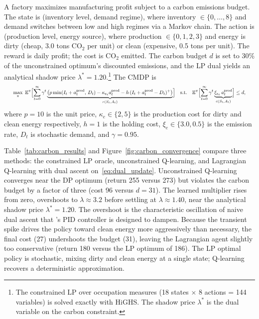 A factory maximizes manufacturing profit subject to a carbon
emissions budget. The state is (inventory level, demand regime),
where inventory $\in \{0,\ldots,8\}$ and demand switches between
low and high regimes via a Markov chain. The action is
(production level, energy source), where production $\in \{0,1,2,3\}$
and energy is dirty (cheap, 3.0 tons CO$_2$ per unit) or clean
(expensive, 0.5 tons per unit). The reward is daily profit; the
cost is CO$_2$ emitted. The carbon budget $d$ is set to 30\% of the
unconstrained optimum's discounted emissions, and the LP dual
yields an analytical shadow price $\lambda^* = 1.20$.\footnote{The
constrained LP over occupation measures (18 states $\times$ 8
actions = 144 variables) is solved exactly with HiGHS. The shadow
price $\lambda^*$ is the dual variable on the carbon constraint.}
The CMDP is
\begin{equation}
\resizebox{.97\linewidth}{!}{$\displaystyle
  \max_\pi \; \mathbb{E}^\pi\Bigl[\sum_{t=0}^\infty \gamma^t
    \underbrace{\bigl(p \min(I_t + a^{\mathrm{prod}}_t,\, D_t)
    - \kappa_{e_t} a^{\mathrm{prod}}_t
    - h\,(I_t + a^{\mathrm{prod}}_t - D_t)^+\bigr)}_{r(S_t, A_t)}\Bigr]
  \quad \text{s.t.} \quad
  \mathbb{E}^\pi\Bigl[\sum_{t=0}^\infty \gamma^t
    \underbrace{\xi_{e_t}\, a^{\mathrm{prod}}_t}_{c(S_t, A_t)}\Bigr]
  \leq d,
$}
  \label{eq:carbon_cmdp}
\end{equation}
where $p = 10$ is the unit price, $\kappa_e \in \{2, 5\}$ is the
production cost for dirty and clean energy respectively,
$h = 1$ is the holding cost, $\xi_e \in \{3.0, 0.5\}$ is the
emission rate, $D_t$ is stochastic demand, and $\gamma = 0.95$.

Table~\ref{tab:carbon_results} and
Figure~\ref{fig:carbon_convergence} compare three methods:
the constrained LP oracle, unconstrained Q-learning, and
Lagrangian Q-learning with dual ascent
on~\eqref{eq:dual_update}. Unconstrained Q-learning converges
near the DP optimum (return 255 versus 273) but violates the
carbon budget by a factor of three (cost 96 versus $d = 31$).
The learned multiplier rises from zero, overshoots to
$\lambda \approx 3.2$ before settling at $\lambda \approx 1.40$,
near the analytical shadow price $\lambda^* = 1.20$.
The overshoot is the characteristic oscillation of naive dual
ascent that \citet{Stooke2020}'s PID controller is designed
to dampen. Because the transient spike drives the policy
toward clean energy more aggressively than necessary, the
final cost (27) undershoots the budget (31), leaving the
Lagrangian agent slightly too conservative (return 180 versus
the LP optimum of 186). The LP optimal policy is stochastic,
mixing dirty and clean energy at a single state; Q-learning
recovers a deterministic approximation.

